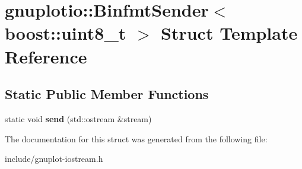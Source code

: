 \hypertarget{structgnuplotio_1_1BinfmtSender_3_01boost_1_1uint8__t_01_4}{}\section{gnuplotio\+:\+:Binfmt\+Sender$<$ boost\+:\+:uint8\+\_\+t $>$ Struct Template Reference}
\label{structgnuplotio_1_1BinfmtSender_3_01boost_1_1uint8__t_01_4}
\subsection*{Static Public Member Functions}
\begin{DoxyCompactItemize}
\item 
\mbox{\label{structgnuplotio_1_1BinfmtSender_3_01boost_1_1uint8__t_01_4_a57d45c45f1ee19614c972bc82c4b214c}} 
static void {\bfseries send} (std\+::ostream \&stream)
\end{DoxyCompactItemize}


The documentation for this struct was generated from the following file\+:\begin{DoxyCompactItemize}
\item 
include/gnuplot-\/iostream.\+h\end{DoxyCompactItemize}
